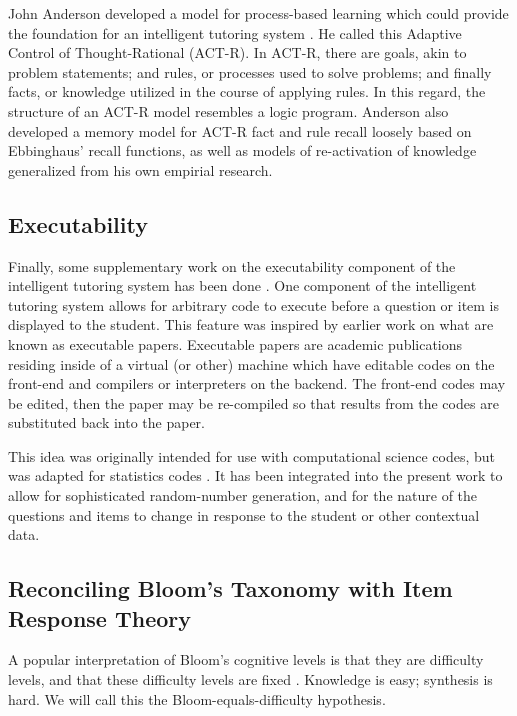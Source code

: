 John Anderson developed a model for process-based learning which could provide
the foundation for an intelligent tutoring system \cite{anderson}.  He called
this Adaptive Control of Thought-Rational (ACT-R).  In ACT-R, there are goals,
akin to problem statements; and rules, or processes used to solve problems; and
finally facts, or knowledge utilized in the course of applying rules.  In this
regard, the structure of an ACT-R model resembles a logic program.  Anderson
also developed a memory model for ACT-R fact and rule recall loosely based on
Ebbinghaus' recall functions, as well as models of re-activation of knowledge
generalized from his own empirial research.


\cite{bacon2003assessing}


\subsection{Executability} 

Finally, some supplementary work on the executability component of the
intelligent tutoring system has been done \cite{castleberry2011}.  One
component of the intelligent tutoring system allows for arbitrary code to
execute before a question or item is displayed to the student.  This feature
was inspired by earlier work on what are known as executable papers.
Executable papers are academic publications residing inside of a virtual (or
other) machine which have editable codes on the front-end and compilers or
interpreters on the backend.  The front-end codes may be edited, then the
paper may be re-compiled so that results from the codes are substituted back
into the paper.  

This idea was originally intended for use with computational science codes, but
was adapted for statistics codes \cite{castleberry2013}.  It has been
integrated into the present work to allow for sophisticated random-number
generation, and for the nature of the questions and items to change in response
to the student or other contextual data.


\subsection{Reconciling Bloom's Taxonomy with Item Response Theory}
\label{sec:reconciling}

A popular interpretation of Bloom's cognitive levels is that they are
difficulty levels, and that these difficulty levels are fixed
\cite{newman1988effect,oliver2004course,lord2007moving,
johnson2006bloom,fuller2007developing}.  Knowledge is easy; synthesis is hard.
We will call this the Bloom-equals-difficulty hypothesis.


